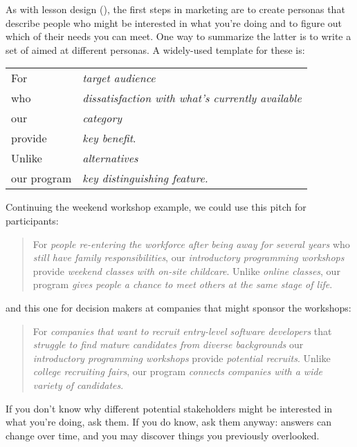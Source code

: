 As with lesson design (),
the first steps in marketing are
to create personas that describe people who might be interested in what you're doing
and to figure out which of their needs you can meet.
One way to summarize the latter is to write a set of 
aimed at different personas.
A widely-used template for these is:

\begin{longtable}{ll}
  For 		& \emph{target audience} \\
  who 		& \emph{dissatisfaction with what's currently available} \\
  our 		& \emph{category} \\
  provide 	& \emph{key benefit}. \\
  Unlike 	& \emph{alternatives} \\
  our program 	& \emph{key distinguishing feature.}
\end{longtable}

\noindent
Continuing the weekend workshop example,
we could use this pitch for participants:

\begin{quote}

  For \emph{people re-entering the workforce after being away for several years}
  who \emph{still have family responsibilities},
  our \emph{introductory programming workshops}
  provide \emph{weekend classes with on-site childcare}.
  Unlike \emph{online classes},
  our program \emph{gives people a chance to meet others at the same stage of life}.

\end{quote}

\noindent
and this one for decision makers at companies that might sponsor the workshops:

\begin{quote}

  For \emph{companies that want to recruit entry-level software developers}
  that \emph{struggle to find mature candidates from diverse backgrounds}
  our \emph{introductory programming workshops}
  provide \emph{potential recruits}.
  Unlike \emph{college recruiting fairs},
  our program \emph{connects companies with a wide variety of candidates}.

\end{quote}

If you don't know why different potential stakeholders might be interested in what you're doing,
ask them.
If you do know,
ask them anyway:
answers can change over time,
and you may discover things you previously overlooked.

